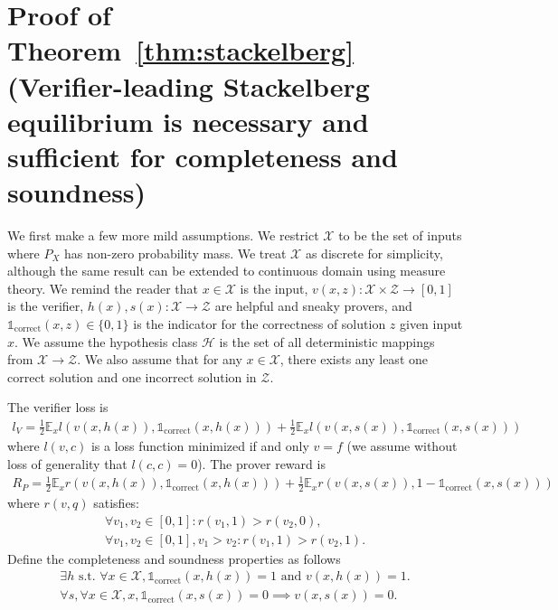 \documentclass{article}
\newcommand{\indcor}[1]{\mathds{1}_{\text{correct}}\left({#1}\right)}
\begin{document}
\clearpage
\section{Proof of Theorem~\ref{thm:stackelberg} (Verifier-leading Stackelberg equilibrium is necessary and sufficient for completeness and soundness)}
\label{sec:app:thm_proof}
We first make a few more mild assumptions. We restrict $\mathcal{X}$ to be the set of inputs where $P_X$ has non-zero probability mass. We treat $\mathcal{X}$ as discrete for simplicity, although the same result can be extended to continuous domain using measure theory. We remind the reader that $x \in \mathcal{X}$ is the input, $v(x, z):\mathcal{X} \times  \mathcal{Z} \rightarrow [0, 1]$ is the verifier, $h(x), s(x) :\mathcal{X} \rightarrow \mathcal{Z}$ are helpful and sneaky provers, and $\indcor{x, z} \in \{0, 1\}$ is the indicator for the correctness of solution $z$ given input $x$. We assume the hypothesis class $\mathcal{H}$ is the set of all deterministic mappings from $\mathcal{X} \rightarrow \mathcal{Z}$. We also assume that for any $x \in \mathcal{X}$, there exists any least one correct solution and one incorrect solution in $\mathcal{Z}$.

The verifier loss is
\begin{align*}
    l_V = \frac{1}{2}\mathbb{E}_x{l(v(x, h(x)), \indcor{x, h(x)})} + \frac{1}{2}\mathbb{E}_x{l(v(x, s(x)), \indcor{x, s(x)})}
\end{align*} where $l(v, c)$ is a loss function minimized if and only $v=f$ (we assume without loss of generality that $l(c, c)=0$). The prover reward is
\begin{align*}
     R_P = \frac{1}{2}\mathbb{E}_x{r(v(x, h(x)), \indcor{x, h(x)})} + \frac{1}{2}\mathbb{E}_x{r(v(x, s(x)), 1-\indcor{x, s(x)})}
\end{align*} where $r(v, q)$ satisfies:
\begin{align*}
    \forall v_1, v_2 \in [0, 1]: r(v_1, 1) > r(v_2, 0), \\
    \forall v_1, v_2 \in [0, 1],v_1>v_2:r(v_1, 1) > r(v_2, 1).
\end{align*}
Define the completeness and soundness properties as follows
\begin{align*}
    \exists h \text{ s.t. } \forall x \in \mathcal{X}, \indcor{x, h(x)}=1 \text{ and } v(x, h(x))=1. \\
    \forall s, \forall x \in \mathcal{X}, x, \indcor{x, s(x)}=0 \implies v(x, s(x))=0.
\end{align*}
\end{document}

